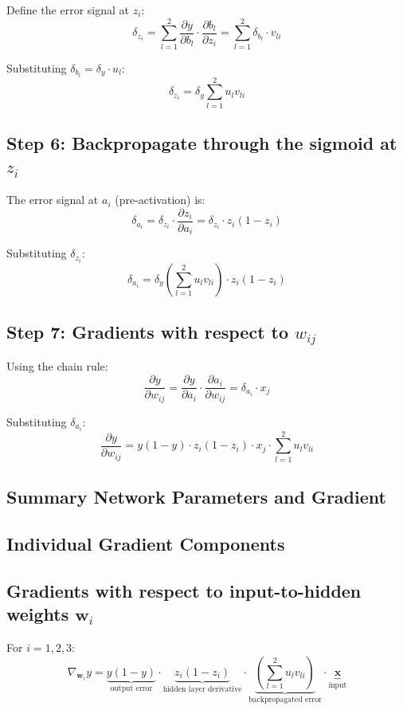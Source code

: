 \documentclass{tufte-handout}
\begin{document}
Define the error signal at $z_i$:
\[
\delta_{z_i} = \sum_{l=1}^2 \frac{\partial y}{\partial b_l} \cdot \frac{\partial b_l}{\partial z_i} = \sum_{l=1}^2 \delta_{b_l} \cdot v_{li}
\]

Substituting $\delta_{b_l} = \delta_y \cdot u_l$:
\[
\delta_{z_i} = \delta_y \sum_{l=1}^2 u_l v_{li}
\]

\subsection*{Step 6: Backpropagate through the sigmoid at $z_i$}

The error signal at $a_i$ (pre-activation) is:
\[
\delta_{a_i} = \delta_{z_i} \cdot \frac{\partial z_i}{\partial a_i} = \delta_{z_i} \cdot z_i(1-z_i)
\]

Substituting $\delta_{z_i}$:
\[
\delta_{a_i} = \delta_y \left(\sum_{l=1}^2 u_l v_{li}\right) \cdot z_i(1-z_i)
\]

\subsection*{Step 7: Gradients with respect to $w_{ij}$}

Using the chain rule:
\[
\frac{\partial y}{\partial w_{ij}} = \frac{\partial y}{\partial a_i} \cdot \frac{\partial a_i}{\partial w_{ij}} = \delta_{a_i} \cdot x_j
\]

Substituting $\delta_{a_i}$:
\[
\boxed{\frac{\partial y}{\partial w_{ij}} = y(1-y) \cdot z_i(1-z_i) \cdot x_j \cdot \sum_{l=1}^2 u_l v_{li}}
\]

\subsection*{Summary Network Parameters and Gradient}


\subsection*{Individual Gradient Components}

\subsection*{Gradients with respect to input-to-hidden weights $\bm{w}_i$}

For $i = 1,2,3$:
\[
\nabla_{\bm{w}_i} y = 
\underbrace{y(1-y)}_{\text{output error}} \cdot 
\underbrace{z_i(1-z_i)}_{\text{hidden layer derivative}} \cdot 
\underbrace{\left(\sum_{l=1}^2 u_l v_{li}\right)}_{\text{backpropagated error}} \cdot 
\underbrace{\bm{x}}_{\text{input}}
\]
\end{document}
